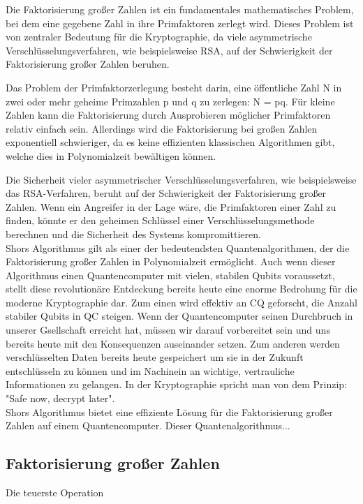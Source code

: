 Die Faktorisierung großer Zahlen \cite[S189]{bernsteinPostquantumCryptography2017} ist ein fundamentales mathematisches Problem, bei dem eine gegebene Zahl in ihre Primfaktoren zerlegt wird. Dieses Problem ist von zentraler Bedeutung für die Kryptographie, da viele asymmetrische Verschlüsselungsverfahren, wie beispielsweise RSA, auf der Schwierigkeit der Faktorisierung großer Zahlen beruhen.

Das Problem der Primfaktorzerlegung besteht darin, eine öffentliche Zahl N in zwei oder mehr geheime Primzahlen p und q zu zerlegen: N = pq. Für kleine Zahlen kann die Faktorisierung durch Ausprobieren möglicher Primfaktoren relativ einfach sein. Allerdings wird die Faktorisierung bei großen Zahlen exponentiell schwieriger, da es keine effizienten klassischen Algorithmen gibt, welche dies in Polynomialzeit bewältigen können.

Die Sicherheit vieler asymmetrischer Verschlüsselungsverfahren, wie beispielsweise das RSA-Verfahren, beruht auf der Schwierigkeit der Faktorisierung großer Zahlen. Wenn ein Angreifer in der Lage wäre, die Primfaktoren einer Zahl zu finden, könnte er den geheimen Schlüssel einer Verschlüsselungsmethode berechnen und die Sicherheit des Systems kompromittieren.\\

Shors Algorithmus \cite{shorAlgorithmsQuantumComputation1994} gilt als einer der bedeutendsten Quantenalgorithmen, der die Faktorisierung großer Zahlen in Polynomialzeit ermöglicht. Auch wenn dieser Algorithmus einen Quantencomputer mit vielen, stabilen Qubits voraussetzt, stellt diese revolutionäre Entdeckung bereits heute eine enorme Bedrohung für die moderne Kryptographie dar.
Zum einen wird effektiv an CQ geforscht, die Anzahl stabiler Qubits in QC steigen. Wenn der Quantencomputer seinen Durchbruch in unserer Gsellschaft erreicht hat, müssen wir darauf vorbereitet sein und uns bereits heute mit den Konsequenzen auseinander setzen. Zum anderen werden verschlüsselten Daten bereits heute gespeichert um sie in der Zukunft entschlüsseln zu können und im Nachinein an wichtige, vertrauliche Informationen zu gelangen. In der Kryptographie spricht man von dem Prinzip: "Safe now, decrypt later".\\

Shors Algorithmus bietet eine effiziente Lösung für die Faktorisierung großer Zahlen auf einem Quantencomputer. Dieser Quantenalgorithmus...

\subsection{Faktorisierung großer Zahlen}

%
Die teuerste Operation \cite*[S.]{gidneyHowFactor20482021}